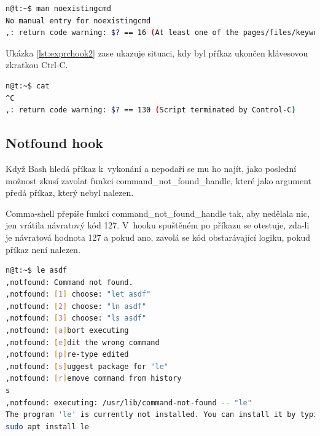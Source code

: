 \documentclass[thesis=M,czech]{FITthesis}[2012/06/26]
\begin{document}
\noindent
\begin{minipage}{\linewidth}
\begin{lstlisting}[language=bash, caption={Explain RC hook}, label={lst:exprchook}]
n@t:~$ man noexistingcmd
No manual entry for noexistingcmd
,: return code warning: $? == 16 (At least one of the pages/files/keywords didn't exist or wasn't matched.)
\end{lstlisting}
\end{minipage}

Ukázka \ref{lst:exprchook2} zase ukazuje situaci, kdy byl příkaz ukončen klávesovou zkratkou Ctrl-C.

\noindent
\begin{minipage}{\linewidth}
\begin{lstlisting}[language=bash, caption={Explain RC hook}, label={lst:exprchook2}]
n@t:~$ cat
^C
,: return code warning: $? == 130 (Script terminated by Control-C)
\end{lstlisting}
\end{minipage}


\subsection{Notfound hook}

Když Bash hledá příkaz k~vykonání a nepodaří se mu ho najít, jako poslední možnost zkusí zavolat funkci command\_not\_found\_handle, které jako argument předá příkaz, který nebyl nalezen.

Comma-shell přepíše funkci command\_not\_found\_handle tak, aby nedělala nic, jen vrátila návratový kód 127. V~hooku spuštěném po příkazu se otestuje, zda-li je návratová hodnota 127 a pokud ano, zavolá se kód obstarávající logiku, pokud příkaz není nalezen.

\begin{minipage}{\linewidth}
\begin{lstlisting}[language=bash, caption={Explain RC hook}, label={lst:notfoundhook}]
n@t:~$ le asdf
,notfound: Command not found.
,notfound: [1] choose: "let asdf"
,notfound: [2] choose: "ln asdf"
,notfound: [3] choose: "ls asdf"
,notfound: [a]bort executing
,notfound: [e]dit the wrong command
,notfound: [p]re-type edited
,notfound: [s]uggest package for "le"
,notfound: [r]emove command from history
s
,notfound: executing: /usr/lib/command-not-found -- "le"
The program 'le' is currently not installed. You can install it by typing:
sudo apt install le
\end{lstlisting}
\end{minipage}
\end{document}
